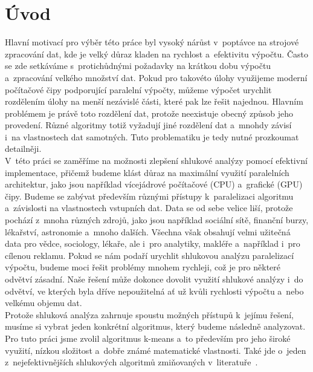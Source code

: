 \pagestyle{plain}
\setcounter{page}{1}

\chapter{Úvod}
Hlavní motivací pro výběr této práce byl vysoký nárůst v~poptávce na strojové zpracování dat, kde je velký důraz kladen na rychlost a~efektivitu výpočtu. Často se zde setkáváme s~protichůdnými požadavky na krátkou dobu výpočtu a~zpracování velkého množství dat.
Pokud pro takovéto úlohy využijeme moderní počítačové čipy podporující paralelní výpočty, můžeme výpočet urychlit rozdělením úlohy na menší nezávislé části, které pak lze řešit najednou. Hlavním problémem je právě toto rozdělení dat, protože neexistuje obecný způsob jeho provedení. Různé algoritmy totiž vyžadují jiné rozdělení dat a~mnohdy závisí i~na vlastnostech dat samotných. Tuto problematiku je tedy nutné prozkoumat detailněji.\\

V~této práci se zaměříme na možnosti zlepšení shlukové analýzy pomocí efektivní implementace, přičemž budeme klást důraz na maximální využití paralelních architektur, jako jsou například vícejádrové počítačové (CPU) a~grafické (GPU) čipy. Budeme se zabývat především různými přístupy k~paralelizaci algoritmu a~závislosti na vlastnostech vstupních dat.
Data se od sebe velice liší, protože pochází z~mnoha různých zdrojů, jako jsou například sociální sítě, finanční burzy, lékařství, astronomie a~mnoho dalších. Všechna však obsahují velmi užitečná data pro vědce, sociology, lékaře, ale i~pro analytiky, makléře a~například i~pro cílenou reklamu.
Pokud se nám podaří urychlit shlukovou analýzu paralelizací výpočtu, budeme moci řešit problémy mnohem rychleji, což je pro některé odvětví zásadní. Naše řešení může dokonce dovolit využití shlukové analýzy i~do odvětví, ve kterých byla dříve nepoužitelná ať už kvůli rychlosti výpočtu a~nebo velkému objemu dat.\\

Protože shluková analýza zahrnuje spoustu možných přístupů k~jejímu ře\-še\-ní, musíme si vybrat jeden konkrétní algoritmus, který budeme následně analyzovat. Pro tuto práci jsme zvolil algoritmus k-means a~to především pro jeho široké využití, nízkou složitost a~dobře známé matematické vlastnosti. Také jde o~jeden z~nejefektivnějších shlukových algoritmů zmiňovaných v~literatuře~\cite{Aggarwal13}.\\

